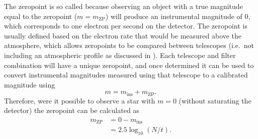 \begin{colsection}
The zeropoint is so called because observing an object with a true magnitude equal to the zeropoint ($m = m_\text{ZP}$) will produce an instrumental magnitude of 0, which corresponds to one electron per second on the detector. The zeropoint is usually defined based on the electron rate that would be measured above the atmosphere, which allows zeropoints to be compared between telescopes (i.e.\ not including an atmospheric profile as discussed in ). Each telescope and filter combination will have a unique zeropoint, and once determined it can be used to convert instrumental magnitudes measured using that telescope to a calibrated magnitude using
%
\begin{equation}
    m = m_\text{ins} + m_\text{ZP}.
    \label{eq:zp}
\end{equation}
%
Therefore, were it possible to observe a star with $m=0$ (without saturating the detector) the zeropoint can be calculated as
%
\begin{equation}
    \begin{split}
        m_\text{ZP} & = 0 - m_\text{ins} \\
                    & = 2.5 \log_{10}(N/t).
    \end{split}
    \label{eq:zp2}
\end{equation}

\newpage

\end{colsection}

